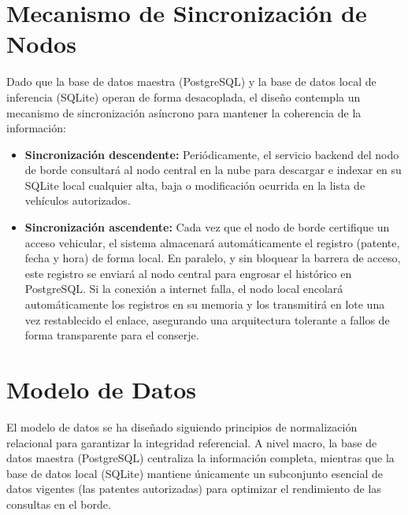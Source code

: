 \section{Mecanismo de Sincronización de Nodos}

Dado que la base de datos maestra (PostgreSQL) y la base de datos local de inferencia (SQLite) operan de forma desacoplada, el diseño contempla un mecanismo de sincronización asíncrono para mantener la coherencia de la información:

\begin{itemize}
    \item \textbf{Sincronización descendente:} Periódicamente, el servicio backend del nodo de borde consultará al nodo central en la nube para descargar e indexar en su SQLite local cualquier alta, baja o modificación ocurrida en la lista de vehículos autorizados.
    \item \textbf{Sincronización ascendente:} Cada vez que el nodo de borde certifique un acceso vehicular, el sistema almacenará automáticamente el registro (patente, fecha y hora) de forma local. En paralelo, y sin bloquear la barrera de acceso, este registro se enviará al nodo central para engrosar el histórico en PostgreSQL. Si la conexión a internet falla, el nodo local encolará automáticamente los registros en su memoria y los transmitirá en lote una vez restablecido el enlace, asegurando una arquitectura tolerante a fallos de forma transparente para el conserje.
\end{itemize}

\section{Modelo de Datos}

El modelo de datos se ha diseñado siguiendo principios de normalización relacional para garantizar la integridad referencial. A nivel macro, la base de datos maestra (PostgreSQL) centraliza la información completa, mientras que la base de datos local (SQLite) mantiene únicamente un subconjunto esencial de datos vigentes (las patentes autorizadas) para optimizar el rendimiento de las consultas en el borde.


